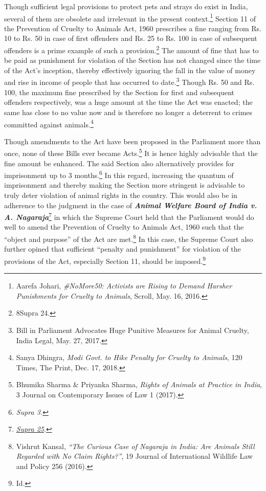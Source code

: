 \begin{multicols}{2}
\noi
Though sufficient legal provisions to protect pets and strays do exist in India, several of them
are obsolete and irrelevant in the present context.\footnote{Aarefa Johari, \textit{\#NoMore50: Activists are Rising to Demand Harsher Punishments for Cruelty to Animals}, Scroll, May. 16, 2016. } Section 11 of the Prevention of Cruelty to
Animals Act, 1960 prescribes a fine ranging from Rs. 10 to Rs. 50 in case of first offenders
and Rs. 25 to Rs. 100 in case of subsequent offenders is a prime example of such a
provision.\footnote{8Supra 24.} The amount of fine that has to be paid as punishment for violation of the Section
has not changed since the time of the Act’s inception, thereby effectively ignoring the fall in
the value of money and rise in income of people that has occurred to date.\footnote{Bill in Parliament Advocates Huge Punitive Measures for Animal Cruelty, India Legal, May. 27, 2017.} Though Rs. 50
and Rs. 100, the maximum fine prescribed by the Section for first and subsequent offenders
respectively, was a huge amount at the time the Act was enacted; the same has close to no
value now and is therefore no longer a deterrent to crimes committed against animals.\footnote{Sanya Dhingra, \textit{Modi Govt. to Hike Penalty for Cruelty to Animals}, 120 Times, The Print, Dec. 17, 2018.}

\noi
Though amendments to the Act have been proposed in the Parliament more than once, none
of these Bills ever became Acts.\footnote{Bhumika Sharma \& Priyanka Sharma, \textit{Rights of Animals at Practice in India}, 3 Journal on Contemporary
Issues of Law 1 (2017).} It is hence highly advisable that the fine amount be
enhanced. The said Section also alternatively provides for imprisonment up to 3 months.\footnote{\textit{Supra 3.}} In
this regard, increasing the quantum of imprisonment and thereby making the Section more
stringent is advisable to truly deter violation of animal rights in the country. This would also
be in adherence to the judgment in the case of {\it {\bfseries Animal Welfare Board of India v. A.
Nagaraja}}\footnote{\underline{{\it Supra 25}}.} in which the Supreme Court held that the Parliament would do well to amend the Prevention of Cruelty to Animals Act, 1960 such that the “object and purpose” of the Act are
met.\footnote{Vishrut Kansal, \textit{“The Curious Case of Nagaraja in India: Are Animals Still Regarded with No Claim Rights?”},
19 Journal of International Wildlife Law and Policy 256 (2016).} In this case, the Supreme Court also further opined that sufficient “penalty and
punishment” for violation of the provisions of the Act, especially Section 11, should be
imposed.\footnote{Id.}


\end{multicols}
